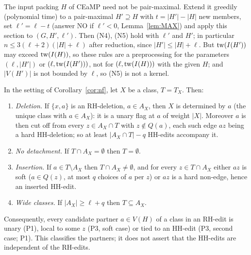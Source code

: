 \begin{remark}\label{rem:ext}
The input packing $H$ of CEaMP need not be pair-maximal. Extend it greedily (polynomial time) to a pair-maximal $H'\supseteq H$ with $t=|H'|-|H|$ new members, set $\ell'=\ell-t$ (answer NO if $\ell'<0$, Lemma~\ref{lem:MAX}) and apply this section to $(G,H',\ell')$. Then (N4), (N5) hold with $\ell'$ and $H'$; in particular $n\le3(\ell+2)(|H|+\ell)$ after reduction, since $|H'|\le|H|+\ell$. But $\mathrm{tw}(I(H'))$ may exceed $\mathrm{tw}(I(H))$, so these rules are a preprocessing for the parameters $(\ell,|H'|)$ or $(\ell,\mathrm{tw}(I(H')))$, not for $(\ell,\mathrm{tw}(I(H)))$ with the given $H$; and $|V(H')|$ is not bounded by $\ell$, so (N5) is not a kernel.
\end{remark}

\begin{proposition}\label{prop:pointer}
In the setting of Corollary~\ref{cor:nf}, let $X$ be a class, $T=T_X$. Then:
\begin{enumerate}
\item[(P1)] \emph{Deletion.} If $\{x,a\}$ is an RH-deletion, $a\in A_X$, then $X$ is determined by $a$ (the unique class with $a\in A_X$): it is a unary flag at $a$ of weight $|X|$. Moreover $a$ is then cut off from every $z\in A_X\cap T$ with $z\notin Q(a)$, each such edge $az$ being a hard HH-deletion; so at least $|A_X\cap T|-q$ HH-edits accompany it.
\item[(P2)] \emph{No detachment.} If $T\cap A_X=\emptyset$ then $T=\emptyset$.
\item[(P3)] \emph{Insertion.} If $a\in T\setminus A_X$ then $T\cap A_X\ne\emptyset$, and for every $z\in T\cap A_X$ either $az$ is soft ($a\in Q(z)$, at most $q$ choices of $a$ per $z$) or $az$ is a hard non-edge, hence an inserted HH-edit.
\item[(P4)] \emph{Wide classes.} If $|A_X|\ge\ell+q$ then $T\subseteq A_X$.
\end{enumerate}
Consequently, every candidate partner $a\in V(H)$ of a class in an RH-edit is unary (P1), local to some $z$ (P3, soft case) or tied to an HH-edit (P3, second case; P1). This classifies the partners; it does not assert that the HH-edits are independent of the RH-edits.
\end{proposition}
